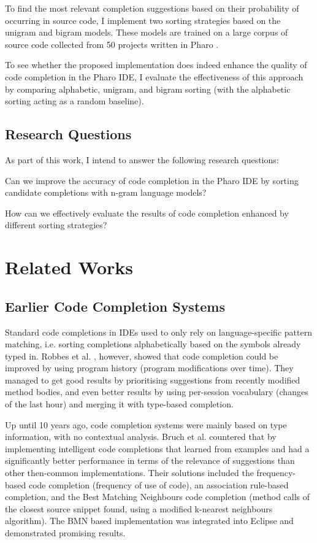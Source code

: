 \documentclass[sigplan,screen]{acmart}
\begin{document}
To find the most relevant completion suggestions based on their probability of occurring in source code, I implement two sorting strategies based on the unigram and bigram models. These models are trained on a large corpus of source code collected from 50 projects written in Pharo \cite{Zait20a}.

To see whether the proposed implementation does indeed enhance the quality of code completion in the Pharo IDE, I evaluate the effectiveness of this approach by comparing alphabetic, unigram, and bigram sorting (with the alphabetic sorting acting as a random baseline).

\subsection{Research Questions}
As part of this work, I intend to answer the following research questions:
\begin{RQ}
    \item Can we improve the accuracy of code completion in the Pharo IDE by sorting candidate completions with n-gram language models?
    \item How can we effectively evaluate the results of code completion enhanced by different sorting strategies?
\end{RQ}

\section{Related Works}
\subsection{Earlier Code Completion Systems}
Standard code completions in IDEs used to only rely on language-specific pattern matching, i.e. sorting completions alphabetically based on the symbols already typed in. Robbes et al. \cite{Robb08a}, however, showed that code completion could be improved by using program history (program modifications over time). They managed to get good results by prioritising suggestions from recently modified method bodies, and even better results by using per-session vocabulary (changes of the last hour) and merging it with type-based completion.

Up until 10 years ago, code completion systems were mainly based on type information, with no contextual analysis. Bruch et al. \cite{Bruc09a} countered that by implementing intelligent code completions that learned from examples and had a significantly better performance in terms of the relevance of suggestions than other then-common implementations. Their solutions included the frequency-based code completion (frequency of use of code), an association rule-based completion, and the Best Matching Neighbours code completion (method calls of the closest source snippet found, using a modified k-nearest neighbours algorithm). The BMN based implementation was integrated into Eclipse and demonstrated promising results.
\end{document}
